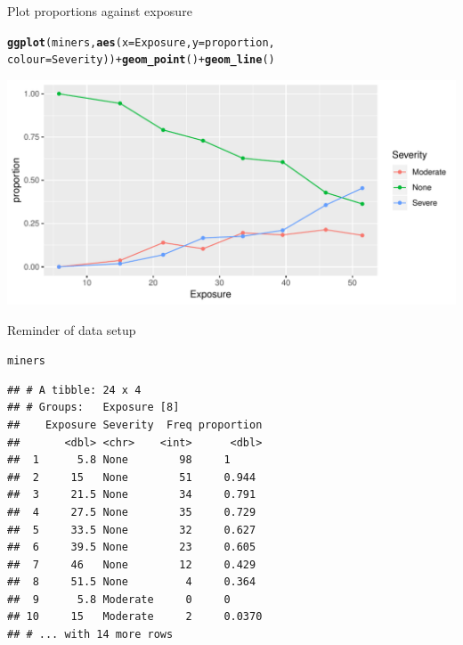 \documentclass[unknownkeysallowed]{beamer}\usepackage[]{graphicx}\usepackage[]{color}
\makeatletter
\def\maxwidth{ %
  \ifdim\Gin@nat@width>\linewidth
    \linewidth
  \else
    \Gin@nat@width
  \fi
}
\newcommand{\hlopt}[1]{\textcolor[rgb]{0,0,0}{#1}}%
\newcommand{\hlstd}[1]{\textcolor[rgb]{0.345,0.345,0.345}{#1}}%
\newcommand{\hlkwc}[1]{\textcolor[rgb]{0.333,0.667,0.333}{#1}}%
\newcommand{\hlkwd}[1]{\textcolor[rgb]{0.737,0.353,0.396}{\textbf{#1}}}%
\newenvironment{kframe}{%
 \def\at@end@of@kframe{}%
 \ifinner\ifhmode%
  \def\at@end@of@kframe{\end{minipage}}%
  \begin{minipage}{\columnwidth}%
 \fi\fi%
 \def\FrameCommand##1{\hskip\@totalleftmargin \hskip-\fboxsep
 \colorbox{shadecolor}{##1}\hskip-\fboxsep
     \hskip-\linewidth \hskip-\@totalleftmargin \hskip\columnwidth}%
 \MakeFramed {\advance\hsize-\width
   \@totalleftmargin\z@ \linewidth\hsize
   \@setminipage}}%
 {\par\unskip\endMakeFramed%
 \at@end@of@kframe}
\newenvironment{knitrout}{}{} %
\makeatother
\begin{document}
\begin{frame}[fragile]{Plot proportions against exposure}
  
\begin{knitrout}\small
{}\color{fgcolor}\begin{kframe}
\begin{alltt}
\hlkwd{ggplot}\hlstd{(miners,}\hlkwd{aes}\hlstd{(}\hlkwc{x}\hlstd{=Exposure,}\hlkwc{y}\hlstd{=proportion,}
                  \hlkwc{colour}\hlstd{=Severity))}\hlopt{+}\hlkwd{geom_point}\hlstd{()}\hlopt{+}\hlkwd{geom_line}\hlstd{()}
\end{alltt}
\end{kframe}
\includegraphics[width=\maxwidth]{figure/unnamed-chunk-79-1} 

\end{knitrout}
  
\end{frame}

\begin{frame}[fragile]{Reminder of data setup}

  \begin{footnotesize}
\begin{knitrout}
\color{fgcolor}\begin{kframe}
\begin{alltt}
\hlstd{miners}
\end{alltt}
\begin{verbatim}
## # A tibble: 24 x 4
## # Groups:   Exposure [8]
##    Exposure Severity  Freq proportion
##       <dbl> <chr>    <int>      <dbl>
##  1      5.8 None        98     1     
##  2     15   None        51     0.944 
##  3     21.5 None        34     0.791 
##  4     27.5 None        35     0.729 
##  5     33.5 None        32     0.627 
##  6     39.5 None        23     0.605 
##  7     46   None        12     0.429 
##  8     51.5 None         4     0.364 
##  9      5.8 Moderate     0     0     
## 10     15   Moderate     2     0.0370
## # ... with 14 more rows
\end{verbatim}
\end{kframe}
\end{knitrout}
  \end{footnotesize}
\end{frame}
\end{document}
